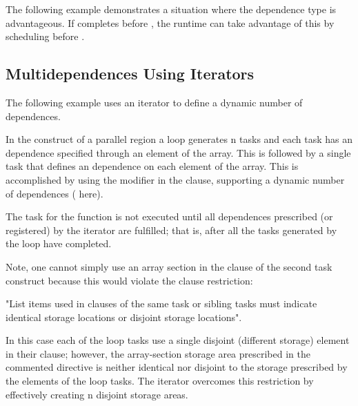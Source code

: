 

The following example demonstrates a situation where the 
dependence type is advantageous. If  completes
before , the runtime can take advantage of this by
scheduling  before .



\subsection{Multidependences Using Iterators}
\label{subsec:depend_iterator}

The following example uses an iterator to define a dynamic number of
dependences.

In the  construct of a parallel region a loop generates n tasks
and each task has an  dependence specified through an element of
the  array.  This is followed by a single task that defines an 
dependence on each element of the array.  This is accomplished by
using the  modifier in the  clause, supporting a dynamic number
of dependences ( here).

The task for the  function is not executed until all dependences
prescribed (or registered) by the iterator are fulfilled; that is,
after all the tasks generated by the loop have completed.

Note, one cannot simply use an array section in the  clause
of the second task construct because this would violate the  clause restriction:

"List items used in  clauses of the same task or sibling tasks
must indicate identical storage locations or disjoint storage locations".

In this case each of the loop tasks use a single disjoint (different storage)
element in their  clause; however,
the array-section storage area prescribed in the commented directive is neither
identical nor disjoint to the storage prescribed by the elements of the
loop tasks.  The iterator overcomes this restriction by effectively
creating n disjoint storage areas.

